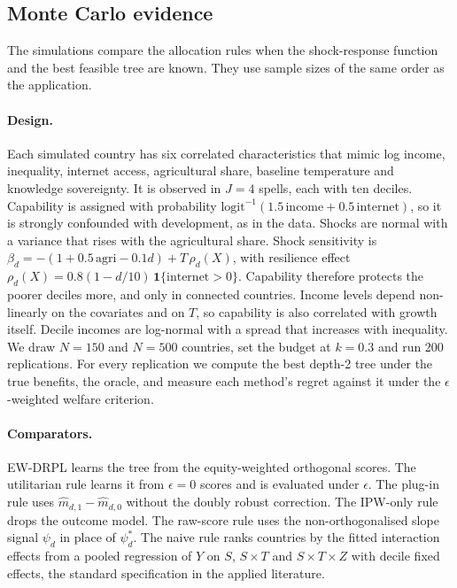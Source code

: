 \subsection{Monte Carlo evidence}\label{sec:mc}

The simulations compare the allocation rules when the shock-response function and the best
feasible tree are known. They use sample sizes of the same order as the application.

\paragraph{Design.} Each simulated country has six correlated characteristics that mimic log income,
inequality, internet access, agricultural share, baseline temperature and knowledge sovereignty.
It is observed in $J=4$ spells, each with ten deciles. Capability is assigned with probability
$\mathrm{logit}^{-1}(1.5\,\text{income}+0.5\,\text{internet})$, so it is strongly confounded with
development, as in the data. Shocks are normal with a variance that rises with the agricultural
share. Shock sensitivity is
$\beta_d=-(1+0.5\,\text{agri}-0.1d)+T\,\rho_d(X)$, with resilience effect
$\rho_d(X)=0.8(1-d/10)\,\mathbf 1\{\text{internet}>0\}$. Capability therefore protects the poorer
deciles more, and only in connected countries. Income levels depend non-linearly on the
covariates and on $T$, so capability is also correlated with growth itself. Decile incomes are
log-normal with a spread that increases with inequality. We draw $N=150$ and $N=500$ countries,
set the budget at $k=0.3$ and run 200 replications. For every replication we compute the best
depth-2 tree under the true benefits, the oracle, and measure each method's regret against it
under the $\epsilon$-weighted welfare criterion.

\paragraph{Comparators.} EW-DRPL learns the tree from the equity-weighted orthogonal scores. The
utilitarian rule learns it from $\epsilon=0$ scores and is evaluated under $\epsilon$. The plug-in
rule uses $\hat m_{d,1}-\hat m_{d,0}$ without the doubly robust correction. The IPW-only rule drops
the outcome model. The raw-score rule uses the non-orthogonalised slope signal $\psi_d$ in place of
$\psi^*_d$. The naive rule ranks countries by the fitted interaction effects from a pooled
regression of $Y$ on $S$, $S\times T$ and $S\times T\times Z$ with decile fixed effects, the
standard specification in the applied literature.


